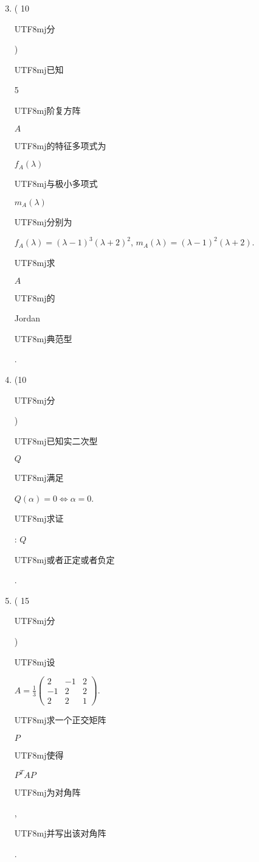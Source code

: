 \documentclass[10pt]{article}
\begin{document}
\begin{enumerate}
  \setcounter{enumi}{2}
  \item ( 10 \begin{CJK}{UTF8}{mj}分\end{CJK}) \begin{CJK}{UTF8}{mj}已知\end{CJK} 5 \begin{CJK}{UTF8}{mj}阶复方阵\end{CJK} $A$ \begin{CJK}{UTF8}{mj}的特征多项式为\end{CJK} $f_{A}(\lambda)$ \begin{CJK}{UTF8}{mj}与极小多项式\end{CJK} $m_{A}(\lambda)$ \begin{CJK}{UTF8}{mj}分别为\end{CJK} $f_{A}(\lambda)=(\lambda-1)^{3}(\lambda+2)^{2}$, $m_{A}(\lambda)=(\lambda-1)^{2}(\lambda+2)$. \begin{CJK}{UTF8}{mj}求\end{CJK} $A$ \begin{CJK}{UTF8}{mj}的\end{CJK} Jordan \begin{CJK}{UTF8}{mj}典范型\end{CJK}.

  \item (10 \begin{CJK}{UTF8}{mj}分\end{CJK}) \begin{CJK}{UTF8}{mj}已知实二次型\end{CJK} $Q$ \begin{CJK}{UTF8}{mj}满足\end{CJK} $Q(\alpha)=0 \Longleftrightarrow \alpha=0$. \begin{CJK}{UTF8}{mj}求证\end{CJK}: $Q$ \begin{CJK}{UTF8}{mj}或者正定或者负定\end{CJK}.

  \item ( 15 \begin{CJK}{UTF8}{mj}分\end{CJK}) \begin{CJK}{UTF8}{mj}设\end{CJK} $A=\frac{1}{3}\left(\begin{array}{ccc}2 & -1 & 2 \\ -1 & 2 & 2 \\ 2 & 2 & 1\end{array}\right)$. \begin{CJK}{UTF8}{mj}求一个正交矩阵\end{CJK} $P$ \begin{CJK}{UTF8}{mj}使得\end{CJK} $P^{T} A P$ \begin{CJK}{UTF8}{mj}为对角阵\end{CJK}, \begin{CJK}{UTF8}{mj}并写出该对角阵\end{CJK}.


\end{enumerate}
\end{document}
